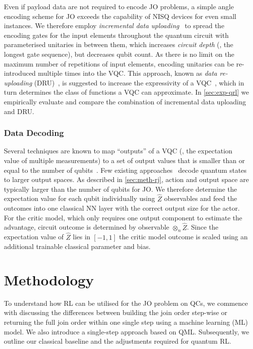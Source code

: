\documentclass[10pt, conference]{IEEEtran}
\begin{document}
Even if payload data are not required to encode JO problems, a
simple angle encoding scheme for JO exceeds the capability of
NISQ devices for even small instances.
We therefore employ \emph{incremental data uploading}~\cite{periyasamy22} to spread the encoding gates for the input elements throughout the quantum circuit with parameterised unitaries in between them, which increases \emph{circuit depth} (\ie, the longest gate sequence), but decreases qubit count.
As there is no limit on the maximum number of repetitions of input elements, encoding unitaries can be re-introduced multiple times into the VQC.
This approach, known as \emph{data re-uploading} (DRU)~\cite{perez20}, is suggested to increase the expressivity of a VQC~\cite{schuld21}, which in turn determines the class of functions a VQC can approximate.
In \autoref{sec:exp-qrl} we empirically evaluate and compare the combination of incremental data uploading and DRU.

\subsubsection{Data Decoding}
\label{subsec:dec}
Several techniques are known to map \enquote{outputs} of a 
VQC (\ie, the expectation value of multiple measurements) to a set 
of output values that is smaller than or equal to the number of 
qubits~\cite{jerbi21, meyer23}.
Few existing approaches~\cite{lockwood21} decode 
quantum states to larger output spaces.
As described in \autoref{sec:meth-rj}, action and output space are typically larger than the number of qubits for JO.
We therefore determine the expectation value for each qubit individually using $\hat{Z}$ observables and feed the outcomes into one classical NN layer with the correct output size for the actor.
For the critic model, which only requires one output component to estimate the advantage, circuit outcome is determined by observable $\otimes_n \hat{Z}$.
Since the expectation value of 
$\hat{Z}$ lies in $[-1,1]$ the critic model outcome is scaled using an additional trainable classical parameter and bias.

\section{Methodology}
\label{sec:methodology}
To understand how RL can be utilised for the JO problem on QCs, 
we commence with discussing the differences between building the join order step-wise or returning the full join order within one single step using a machine learning (ML) model. We also introduce a single-step approach based on QML.
Subsequently, we outline our classical baseline \rj and the adjustments required for quantum RL.
\end{document}
